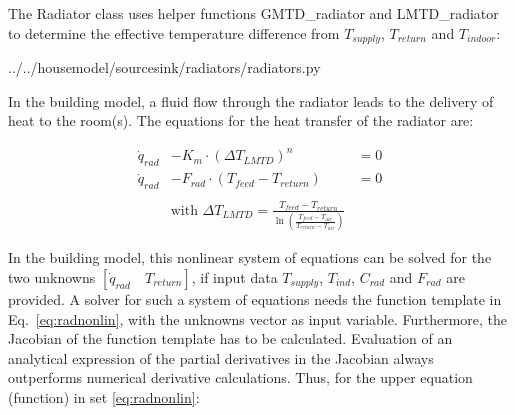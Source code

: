 The Radiator class uses helper functions \textsf{GMTD\_radiator} and \textsf{LMTD\_radiator} to determine the effective temperature difference from $T_{supply}$, $T_{return}$ and $T_{indoor}$:

 
{../../housemodel/sourcesink/radiators/radiators.py}

In the building model, a fluid flow through the radiator leads to the delivery of heat to the room(s). The equations for the heat transfer of the radiator are: 

{\color{blue}
	\begin{equation}
		\label{eq:radnonlin}
		\begin{aligned}
			\dot{q}_{rad} &- K_m \cdot (\Delta T_{LMTD})^n &= 0 \\
			\dot{q}_{rad} &- F_{rad} \cdot (T_{feed} - T_{return}) &= 0 \\ \\
			&\text{with } \Delta T_{LMTD} = \frac{T_{feed} - T_{return}}{\ln\left(\frac{T_{feed} -T_{air}}{T_{return} - T_{air}}\right)}
		\end{aligned}
	\end{equation}
}

In the building model, this nonlinear system of equations can be solved for the two unknowns $[\dot{q}_{rad} \quad T_{return}]$, if input data $T_{supply}$, $ T_{ind}$, $C_{rad}$ and $F_{rad}$ are provided. A solver for such a system of equations needs the function template in Eq.~\ref{eq:radnonlin}, with the unknowns vector as input variable. Furthermore, the Jacobian of the function template has to be calculated. Evaluation of an analytical expression of the partial derivatives in the Jacobian always outperforms numerical derivative calculations. Thus, for the upper equation (function) in set \ref{eq:radnonlin}:

